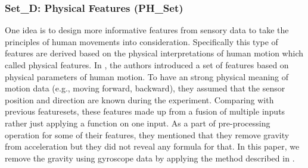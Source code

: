 \documentclass[journal,article,submit,moreauthors,pdftex]{Definitions/mdpi}
\newcommand{\hosein}[1]{\textcolor{orange}{{\it [Hosein: #1]}}}
\begin{document}
\subsubsection{Set\_D: Physical Features (PH\_Set)}
One idea is to design more informative features from sensory data to take the principles of human movements into consideration. Specifically this type of features are derived based on the physical interpretations of human motion which called physical features. In \cite{zhang2011feature}, the authors introduced a set of features based on physical parameters of human motion. To have an strong physical meaning of motion data (e.g., moving forward, backward), they assumed that the sensor position and direction are known during the experiment. Comparing with previous featuresets, these features made up from a fusion of multiple inputs rather just applying a function on one input. As a part of pre-processing operation for some of their features, they mentioned that they remove gravity from acceleration but they did not reveal any formula for that. In this paper, we remove the gravity using gyroscope data by applying the method described in \cite{Accelero5:online}.
%
\end{document}
